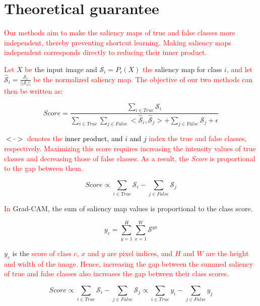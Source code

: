 \documentclass[preprint,7pt, a4paper]{elsarticle}
\begin{document}
\section{Theoretical guarantee}
\label{Appendix:D}

\textcolor{red}{Our methods aim to make the saliency maps of true and false classes more independent, thereby preventing shortcut learning. Making saliency maps independent corresponds directly to reducing their inner product.} 

\textcolor{red}{Let} $X$ \textcolor{red}{be} the input image and $\mathcal{S}_i = P_i(X)$ \textcolor{red}{the} saliency map for class $i$\textcolor{red}{, and let} $\hat{\mathcal{S}}_i = \frac{\mathcal{S}_i}{||\mathcal{S}_i||}$ \textcolor{red}{be the normalized saliency map. The objective of our two methods can then be written as:}

\begin{equation*}
 Score = \frac{\sum_{i \in True} \mathcal{S}_{i}}{\sum_{i \in True} \sum_{j \in False} <\hat{\mathcal{S}}_i, \hat{\mathcal{S}}_j> + \sum_{j \in False}\mathcal{S}_{j} + \epsilon}    
\end{equation*}

\textcolor{black}{$<\cdot>$ \textcolor{red}{denotes the} inner product, and $i$ and $j$ \textcolor{red}{index the true and false classes, respectively. Maximizing this score requires increasing the intensity values of true classes and decreasing those of false classes. As a result, the \textit{Score} is proportional to the gap between them.}}

\begin{equation*}
    Score \propto \sum_{i \in True} \mathcal{S}_i - \sum_{j \in False} \mathcal{S}_j
\end{equation*}

\textcolor{red}{In} Grad-CAM, the sum of saliency map values is proportional to the class score. 

\begin{equation*}
    y_c = \sum_{y = 1}^H \sum_{x = 1}^W \mathcal{S}^{yx}
\end{equation*}

$y_c$ is the \textcolor{red}{score of class $c$, $x$ and $y$ are pixel indices, and $H$ and $W$ are the height and width of the image. Hence, increasing the gap between the summed saliency of true and false classes also increases the gap between their class scores.}

\begin{equation*}
    Score \propto \sum_{i \in True} \mathcal{S}_i - \sum_{j \in False} \mathcal{S}_j \propto \sum_{i \in True} y_i - \sum_{j \in False} y_j
\end{equation*}
\end{document}
